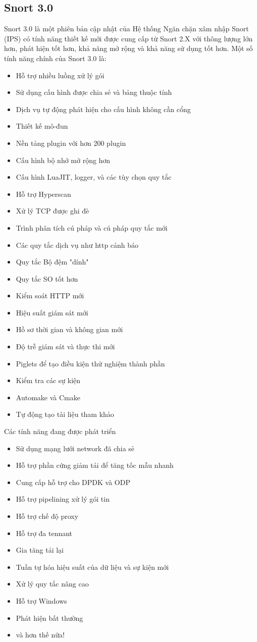 \subsection{Snort 3.0}
Snort 3.0 là một phiên bản cập nhật của Hệ thống Ngăn chặn xâm nhập Snort (IPS) có tính năng thiết kế mới được cung cấp từ Snort 2.X với thông lượng lớn hơn, phát hiện tốt hơn, khả năng mở rộng và khả năng sử dụng tốt hơn. 
Một số tính năng chính của Snort 3.0 là:
\begin{itemize}
    \item Hỗ trợ nhiều luồng xử lý gói
    \item Sử dụng cấu hình được chia sẻ và bảng thuộc tính 
    \item Dịch vụ tự động phát hiện cho cấu hình không cần cổng
    \item Thiết kế mô-đun
    \item Nền tảng plugin với hơn 200 plugin
    \item Cấu hình bộ nhớ mở rộng hơn
    \item Cấu hình LuaJIT, logger, và các tùy chọn quy tắc
    \item Hỗ trợ Hyperscan
    \item Xử lý TCP được ghi đè
    \item Trình phân tích cú pháp và cú pháp quy tắc mới
    \item Các quy tắc dịch vụ như http cảnh báo
    \item Quy tắc  Bộ đệm "dính" 
    \item Quy tắc SO tốt hơn
    \item Kiểm soát HTTP mới
    \item Hiệu suất giám sát mới
    \item Hồ sơ thời gian và không gian mới
    \item Độ trễ giám sát và thực thi mới
    \item Piglets để tạo điều kiện thử nghiệm thành phần
    \item Kiểm tra các sự kiện
    \item Automake và Cmake
    \item Tự động tạo tài liệu tham khảo 
\end{itemize}
Các tính năng đang được phát triển
\begin{itemize}
    \item Sử dụng mạng lưới network đã chia sẻ
    \item Hỗ trợ phần cứng giảm tải để tăng tốc mẫu nhanh
    \item Cung cấp hỗ trợ cho DPDK và ODP
    \item Hỗ trợ pipelining xử lý gói tin
    \item Hỗ trợ chế độ proxy
    \item Hỗ trợ đa tennant
    \item Gia tăng tải lại
    \item Tuần tự hóa hiệu suất của dữ liệu và sự kiện mới
    \item Xử lý quy tắc nâng cao
    \item Hỗ trợ Windows
    \item Phát hiện bất thường
    \item và hơn thế nữa!
\end{itemize}

